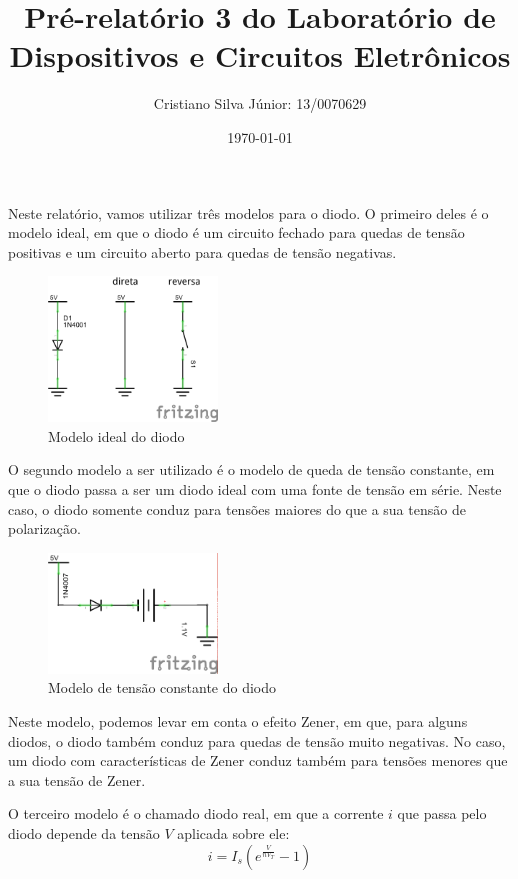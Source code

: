 \documentclass[12pt, a4paper, twoside]{article}
\begin{document}
\title{Pré-relatório 3 do Laboratório de Dispositivos e Circuitos Eletrônicos}
\author{Cristiano Silva Júnior: 13/0070629}
\date{\today}
\maketitle

Neste relatório, vamos utilizar três modelos para o diodo. O primeiro deles é o modelo
ideal, em que o diodo é um circuito fechado para quedas de tensão positivas e um
circuito aberto para quedas de tensão negativas.

\begin{figure}[H]
    \centering
    \includegraphics[width=0.4\textwidth]{figs/diode.png}
    \caption{Modelo ideal do diodo}
\end{figure}

O segundo modelo a ser utilizado é o modelo de queda de tensão constante, em que o
diodo passa a ser um diodo ideal com uma fonte de tensão em série. Neste caso, o diodo
somente conduz para tensões maiores do que a sua tensão de polarização.

\begin{figure}[H]
    \centering
    \includegraphics[width=0.4\textwidth]{figs/diode2.png}
    \caption{Modelo de tensão constante do diodo}
\end{figure}

Neste modelo, podemos levar em conta o efeito Zener, em que, para alguns diodos, o diodo
também conduz para quedas de tensão muito negativas. No caso, um diodo com
características de Zener conduz também para tensões menores que a sua tensão de Zener.

O terceiro modelo é o chamado diodo real, em que a corrente $i$ que passa pelo diodo
depende da tensão $V$ aplicada sobre ele:
$$i = I_s\left( e^{\frac{V}{nV_T}} - 1 \right)$$
\end{document}
